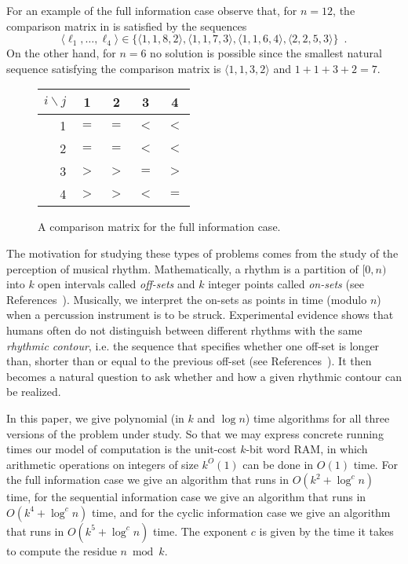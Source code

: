 \documentclass{elsart}
\begin{document}
For an example of the full information case observe that, for $n=12$,
the comparison matrix in  is satisfied by the
sequences 
\[ \langle\ell_1,\ldots,\ell_4\rangle\in
\{\langle1,1,8,2\rangle, \langle1,1,7,3\rangle, \langle1,1,6,4\rangle,
\langle2,2,5,3\rangle\} \enspace .
\]
On the other hand, for $n=6$ no solution is
possible since the smallest natural sequence satisfying the comparison
matrix is $\langle1,1,3,2\rangle$ and $1+1+3+2=7$.

\begin{figure}
\begin{center}
\begin{tabular}{r|cccc}
$i\backslash j$ & 1 & 2 & 3 & 4 \\ \hline
1 & $=$ & $=$ & $<$ & $<$ \\
2 & $=$ & $=$ & $<$ & $<$ \\
3 & $>$ & $>$ & $=$ & $>$ \\
4 & $>$ & $>$ & $<$ & $=$ \\
\end{tabular}
\end{center}
\caption{A comparison matrix for the full information case.}
\end{figure}

The motivation for studying these types of problems comes from the
study of the perception of musical rhythm.  Mathematically, a rhythm
is a partition  of $[0,n)$ into $k$ open intervals called
\emph{off-sets} and $k$ integer points called \emph{on-sets} (see
References~\cite{dfgrt04,t02,t03a,t03b,t04}).  Musically, we interpret
the on-sets as points in time (modulo $n$) when a percussion
instrument is to be struck.  Experimental evidence shows that humans
often do not distinguish between different rhythms with the same
\emph{rhythmic contour}, i.e.  the sequence that specifies whether one
off-set is longer than, shorter than or equal to the previous off-set
(see References~\cite{d78,ftrkp04,kcgv00,l96}).  It then becomes a
natural question to ask whether and how a given rhythmic contour can
be realized.

In this paper, we give polynomial (in $k$ and $\log n$) time
algorithms for all three versions of the problem under study.  So that
we may express concrete running times our model of computation is the
unit-cost $k$-bit word RAM, in which arithmetic operations on integers
of size $k^O(1)$ can be done in $O(1)$ time.  For the full information
case we give an algorithm that runs in $O(k^2 + \log^cn)$ time, for
the sequential information case we give an algorithm that runs in
$O(k^4+\log^c n)$ time, and for the cyclic information case we give an
algorithm that runs in $O(k^5+\log^c n)$ time.  The exponent $c$ is
given by the time it takes to compute the residue $n\bmod k$.
\end{document}

